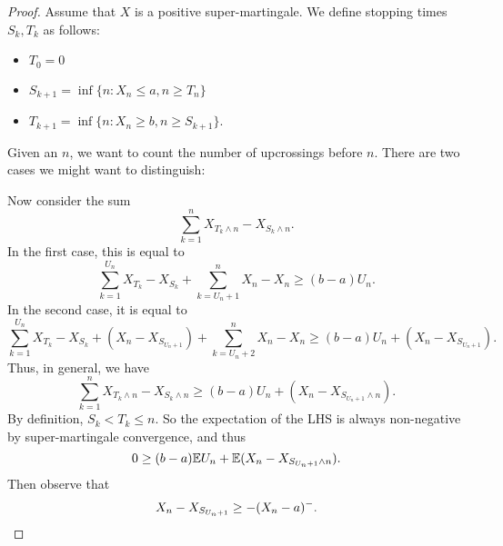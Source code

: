 \documentclass[a4paper]{article}
\begin{document}
\begin{proof}
  Assume that $X$ is a positive super-martingale. We define stopping times $S_k, T_k$ as follows:
  \begin{itemize}
    \item $T_0 = 0$
    \item $S_{k + 1} = \inf\{n: X_n \leq a, n \geq T_n\}$
    \item $T_{k + 1} = \inf\{n: X_n \geq b, n \geq S_{k + 1}\}$.
  \end{itemize}
  Given an $n$, we want to count the number of upcrossings before $n$. There are two cases we might want to distinguish:
  \begin{center}
  \end{center}
  Now consider the sum
  \[
    \sum_{k = 1}^n X_{T_k \wedge n} - X_{S_k \wedge n}.
  \]
  In the first case, this is equal to
  \[
    \sum_{k = 1}^{U_n} X_{T_k} - X_{S_k} + \sum_{k = U_n + 1}^n X_n - X_n \geq (b - a) U_n.
  \]
  In the second case, it is equal to
  \[
    \sum_{k = 1}^{U_n} X_{T_k} - X_{S_k} + (X_n - X_{S_{U_n + 1}}) + \sum_{k = U_n + 2}^n X_n - X_n \geq (b - a) U_n + (X_n - X_{S_{U_n + 1}}).
  \]
  Thus, in general, we have
  \[
    \sum_{k = 1}^n X_{T_k \wedge n} - X_{S_k \wedge n} \geq (b - a) U_n + (X_n - X_{S_{U_n + 1} \wedge n}).
  \]
  By definition, $S_k < T_k \leq n$. So the expectation of the LHS is always non-negative by super-martingale convergence, and thus
  \[
    0 \geq (b - a) \mathbb{E} U_n + \mathbb{E}(X_n - X_{S_{U_n + 1} \wedge n}).
  \]
  Then observe that
  \[
    X_n- X_{S_{U_n + 1}} \geq - (X_n - a)^-.\qedhere
  \]
\end{proof}
%
\end{document}
